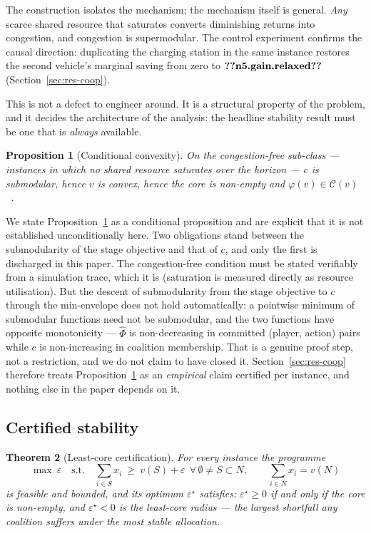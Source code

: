\documentclass[preprint, 3p, review, 12pt]{elsarticle}
\newtheorem{theorem}{Theorem}
\newtheorem{proposition}[theorem]{Proposition}
\theoremstyle{definition}
\begin{document}
The construction isolates the mechanism; the mechanism itself is general. \emph{Any} scarce
shared resource that saturates converts diminishing returns into congestion, and congestion
is supermodular. The control experiment confirms the causal direction: duplicating the
charging station in the same instance restores the second vehicle's marginal saving from
zero to $\jnum{n5.gain.relaxed}$ (Section~\ref{sec:res-coop}).

This is not a defect to engineer around. It is a structural property of the problem, and it
decides the architecture of the analysis: the headline stability result must be one that is
\emph{always} available.

\begin{proposition}[Conditional convexity]
\label{prop:p5}
On the congestion-free sub-class --- instances in which no shared resource saturates over the
horizon --- $c$ is submodular, hence $v$ is convex, hence the core is non-empty and
$\varphi(v)\in \mathcal{C}(v)$~\citep{shapley1971cores}.
\end{proposition}

We state Proposition~\ref{prop:p5} as a conditional proposition and are explicit that it is
not established unconditionally here. Two obligations stand between the submodularity of the
stage objective and that of $c$, and only the first is discharged in this paper. The
congestion-free condition must be stated verifiably from a simulation trace, which it is
(saturation is measured directly as resource utilisation). But the descent of submodularity
from the stage objective to $c$ through the min-envelope does not hold automatically: a
pointwise minimum of submodular functions need not be submodular, and the two functions have
opposite monotonicity --- $\widehat{\Phi}$ is non-decreasing in committed (player, action)
pairs while $c$ is non-increasing in coalition membership. That is a genuine proof step, not a
restriction, and we do not claim to have closed it. Section~\ref{sec:res-coop} therefore
treats Proposition~\ref{prop:p5} as an \emph{empirical} claim certified per instance, and
nothing else in the paper depends on it.

\subsection{Certified stability}

\begin{theorem}[Least-core certification]
\label{thm:leastcore}
For every instance the programme
\begin{equation}
\max\ \varepsilon \quad\text{s.t.}\quad
\sum_{i\in S}x_i \ \ge\ v(S)+\varepsilon \ \ \forall\, \emptyset\neq S\subset N,
\qquad \sum_{i\in N}x_i = v(N)
\label{eq:leastcore}
\end{equation}
is feasible and bounded, and its optimum $\varepsilon^\star$ satisfies: $\varepsilon^\star\ge0$
if and only if the core is non-empty, and $\varepsilon^\star<0$ is the least-core radius ---
the largest shortfall any coalition suffers under the most stable allocation.
\end{theorem}
\end{document}
